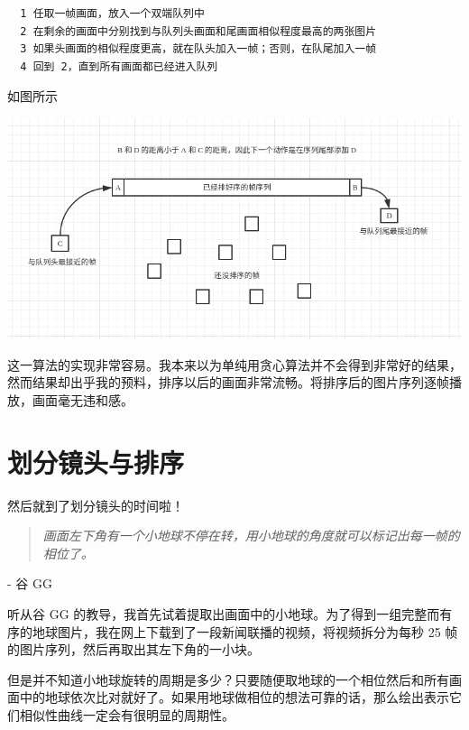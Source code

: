 \documentclass[a4paper, fontset=none]{article}
\begin{document}
\begin{verbatim}
  1 任取一帧画面，放入一个双端队列中
  2 在剩余的画面中分别找到与队列头画面和尾画面相似程度最高的两张图片
  3 如果头画面的相似程度更高，就在队头加入一帧；否则，在队尾加入一帧
  4 回到 2，直到所有画面都已经进入队列
\end{verbatim}

如图所示

\begin{center}
  \includegraphics[width=\textwidth]{./sec2.png}
\end{center}

这一算法的实现非常容易。我本来以为单纯用贪心算法并不会得到非常好的结果，然而结果却出乎我的预料，排序以后的画面非常流畅。将排序后的图片序列逐帧播放，画面毫无违和感。

\section{划分镜头与排序}
\label{sec:镜头分组排序}

然后就到了划分镜头的时间啦！

\begin{quotation} \textit{画面左下角有一个小地球不停在转，用小地球的角度就可以标记出每一帧的相位了。} \end{quotation} \begin{flushright} - 谷 GG \end{flushright}

听从谷 GG 的教导，我首先试着提取出画面中的小地球。为了得到一组完整而有序的地球图片，我在网上下载到了一段新闻联播的视频，将视频拆分为每秒 25 帧的图片序列，然后再取出其左下角的一小块。

但是并不知道小地球旋转的周期是多少？只要随便取地球的一个相位然后和所有画面中的地球依次比对就好了。如果用地球做相位的想法可靠的话，那么绘出表示它们相似性曲线一定会有很明显的周期性。
\end{document}
